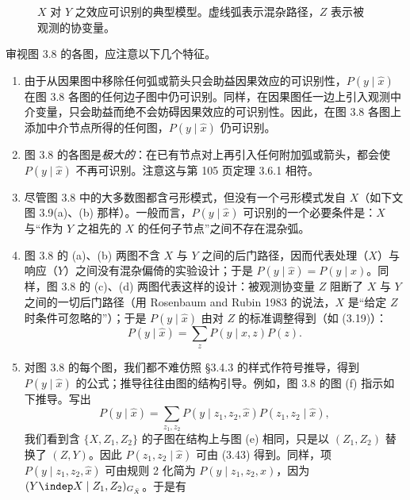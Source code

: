 \begin{figure}[htbp]
\caption{$X$ 对 $Y$ 之效应可识别的典型模型。虚线弧表示混杂路径，$Z$ 表示被观测的协变量。}
\label{fig:3.8}
\end{figure}

审视图 3.8 的各图，应注意以下几个特征。
\begin{enumerate}[label=\arabic*.,leftmargin=1.8em]
\item 由于从因果图中移除任何弧或箭头只会助益因果效应的可识别性，$P(y\mid\hat{x})$ 在图 3.8 各图的任何边子图中仍可识别。同样，在因果图任一边上引入观测中介变量，只会助益而绝不会妨碍因果效应的可识别性。因此，在图 3.8 各图上添加中介节点所得的任何图，$P(y\mid\hat{x})$ 仍可识别。
\item 图 3.8 的各图是\emph{极大的}：在已有节点对上再引入任何附加弧或箭头，都会使 $P(y\mid\hat{x})$ 不再可识别。注意这与第 105 页定理 3.6.1 相符。
\item 尽管图 3.8 中的大多数图都含弓形模式，但没有一个弓形模式发自 $X$（如下文图 3.9(a)、(b) 那样）。一般而言，$P(y\mid\hat{x})$ 可识别的一个必要条件是：$X$ 与“作为 $Y$ 之祖先的 $X$ 的任何子节点”之间不存在混杂弧。
\item 图 3.8 的 (a)、(b) 两图不含 $X$ 与 $Y$ 之间的后门路径，因而代表处理（$X$）与响应（$Y$）之间没有混杂偏倚的实验设计；于是 $P(y\mid\hat{x})=P(y\mid x)$。同样，图 3.8 的 (c)、(d) 两图代表这样的设计：被观测协变量 $Z$ 阻断了 $X$ 与 $Y$ 之间的一切后门路径（用 Rosenbaum and Rubin 1983 的说法，$X$ 是“给定 $Z$ 时条件可忽略的”）；于是 $P(y\mid\hat{x})$ 由对 $Z$ 的标准调整得到（如 \textup{(3.19)}）：
\[
P(y\mid\hat{x})=\sum_{z}P(y\mid x,z)P(z).
\]
\item 对图 3.8 的每个图，我们都不难仿照 \S 3.4.3 的样式作符号推导，得到 $P(y\mid\hat{x})$ 的公式；推导往往由图的结构引导。例如，图 3.8 的图 (f) 指示如下推导。写出
\[
P(y\mid\hat{x})=\sum_{z_1,z_2}P(y\mid z_1,z_2,\hat{x})P(z_1,z_2\mid\hat{x}),
\]
我们看到含 $\{X,Z_1,Z_2\}$ 的子图在结构上与图 (e) 相同，只是以 $(Z_1,Z_2)$ 替换了 $(Z,Y)$。因此 $P(z_1,z_2\mid\hat{x})$ 可由 \textup{(3.43)} 得到。同样，项 $P(y\mid z_1,z_2,\hat{x})$ 可由规则 2 化简为 $P(y\mid z_1,z_2,x)$，因为 $(Y\indep X\mid Z_1,Z_2)_{G_{\bar{X}}}$。于是有

\end{enumerate}
